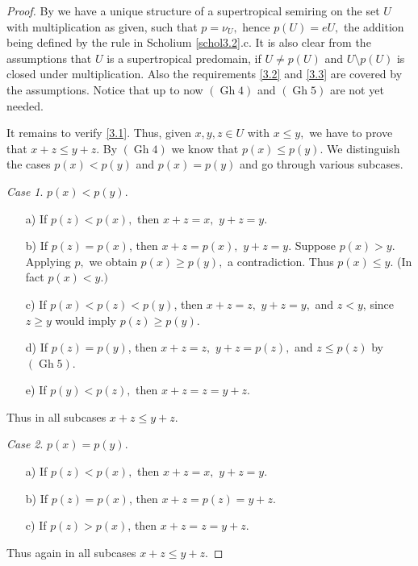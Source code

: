 \documentclass [12pt,a4paper,reqno]{amsart}
\begin{document}
\begin{proof} By \cite[Theorem 3.1]{IKR2} we have a unique structure of a
supertropical semiring on the set $U$ with multiplication as
given, such that $p=\nu _U,$ hence $p(U)=eU,$ the addition being
defined by the rule in Scholium \ref{schol3.2}.c. It is also clear
from the assumptions that $U$ is a supertropical predomain, if
$U\ne p(U)$ and $U\setminus p(U)$ is closed under multiplication.
Also the requirements \eqref{3.2} and \eqref{3.3} are covered by
the assumptions. Notice that up to now $({\operatorname{Gh}}4)$ and $({\operatorname{Gh}}5)$ are
not yet needed.

It remains to verify \eqref{3.1}. Thus, given $x,y,z\in U$ with
$x\le y,$ we have to prove that $x+z\le y+z.$ By $({\operatorname{Gh}}4)$ we know
that $p(x)\le p(y).$ We distinguish the cases $p(x)<p(y)$ and
$p(x)=p(y)$ and go through various subcases.

\textit{Case 1}. $p(x)<p(y).$

\begin{enumerate}\item[a)] If $p(z)<p(x),$ then $x+z=x,$ $y+z=y.$

\item[b)] If $p(z)=p(x)$, then $x+z=p(x),$ $y+z=y.$ Suppose
$p(x)>y.$ Applying $p,$ we obtain $p(x)\ge p(y),$ a contradiction.
Thus $p(x)\le y.$ (In fact $p(x)<y.)$

\item[c)] If $p(x)<p(z)<p(y)$, then $x+z=z,$ $y+z=y,$ and $z<y$,
since $z\ge y$ would imply $p(z)\ge p(y).$

\item[d)] If $p(z)=p(y)$, then $x+z=z,$ $y+z=p(z),$ and $z\le
p(z)$ by $({\operatorname{Gh}}5)$.

\item[e)] If $p(y)<p(z),$ then $x+z=z=y+z.$
\end{enumerate}
Thus in all subcases $x+z\le y+z.$

\textit{Case 2}. $p(x)=p(y).$

\begin{enumerate}\item[a)] If $p(z)<p(x),$ then $x+z=x,$ $y+z=y.$

\item[b)] If $p(z)=p(x)$, then $x+z=p(z)=y+z.$

\item[c)] If $p(z)>p(x) $, then $x+z= z=y+z.$
\end{enumerate}
Thus again in all subcases $x+z\le y+z.$
\end{proof}
\end{document}
